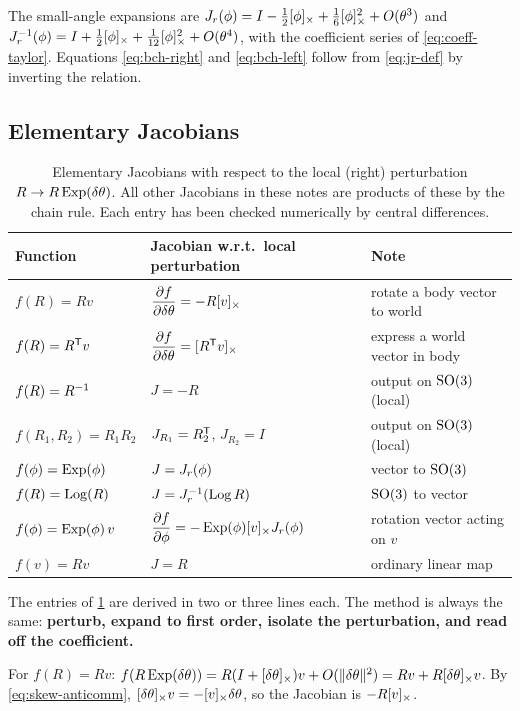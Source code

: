 The small-angle expansions are $J_r(\phi) = I - \tfrac12[\phi]_{\times} + \tfrac16[\phi]_{\times}^2 + O(\theta^3)$ and
$J_r^{-1}(\phi) = I + \tfrac12[\phi]_{\times} + \tfrac1{12}[\phi]_{\times}^2 + O(\theta^4)$, with the coefficient series of
\eqref{eq:coeff-taylor}. Equations \eqref{eq:bch-right} and \eqref{eq:bch-left} follow from
\eqref{eq:jr-def} by inverting the relation.

\subsection{Elementary Jacobians}

\begin{table}[t]
\centering\small
\renewcommand{\arraystretch}{1.35}
\begin{tabular}{@{}l l l@{}}
\toprule
Function & Jacobian w.r.t.\ local perturbation & Note \\
\midrule
$f(R) = Rv$ & $\dfrac{\partial f}{\partial\delta\theta} = -R[v]_{\times}$ & rotate a body vector to world \\
$f(R) = R^{\mathsf{T}} v$ & $\dfrac{\partial f}{\partial\delta\theta} = [R^{\mathsf{T}} v]_{\times}$ & express a world vector in body \\
$f(R) = R^{-1}$ & $J = -R$ & output on $\mathrm{SO}(3)$ (local) \\
$f(R_1, R_2) = R_1R_2$ & $J_{R_1} = R_2^{\mathsf{T}}$, \quad $J_{R_2} = I$ & output on $\mathrm{SO}(3)$ (local) \\
$f(\phi) = \operatorname{Exp}(\phi)$ & $J = J_r(\phi)$ & vector to $\mathrm{SO}(3)$ \\
$f(R) = \operatorname{Log}(R)$ & $J = J_r^{-1}(\operatorname{Log} R)$ & $\mathrm{SO}(3)$ to vector \\
$f(\phi) = \operatorname{Exp}(\phi)\,v$ & $\dfrac{\partial f}{\partial\phi} = -\operatorname{Exp}(\phi)[v]_{\times}J_r(\phi)$ & rotation vector acting on $v$ \\
$f(v) = Rv$ & $J = R$ & ordinary linear map \\
\bottomrule
\end{tabular}
\caption{Elementary Jacobians with respect to the local (right) perturbation $R \to R\operatorname{Exp}(\delta\theta)$. All
other Jacobians in these notes are products of these by the chain rule. Each entry has been checked
numerically by central differences.}
\label{tab:jacobians}
\end{table}

The entries of \cref{tab:jacobians} are derived in two or three lines each. The method is always the same:
\textbf{perturb, expand to first order, isolate the perturbation, and read off the coefficient.}

\begin{example}
\label{ex:rotation-action}
For $f(R) = Rv$: $f(R\operatorname{Exp}(\delta\theta)) = R(I + [\delta\theta]_{\times})v + O(\|\delta\theta\|^2) = Rv + R[\delta\theta]_{\times}v$.
By \eqref{eq:skew-anticomm}, $[\delta\theta]_{\times}v = -[v]_{\times}\delta\theta$, so the Jacobian is $-R[v]_{\times}$.
\end{example}

